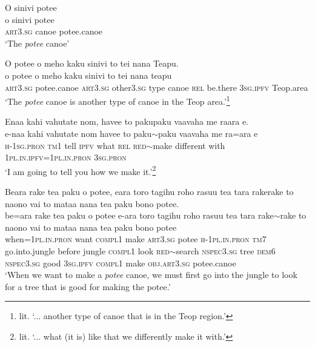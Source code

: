 \ea\label{ex:text18-1}
O sinivi potee\\
\gll o	sinivi	potee\\
     \textsc{art}3.\textsc{sg}	canoe	potee.canoe\\
\glt `The \textit{potee} canoe'
\z
\largerpage[2]

\ea\label{ex:text18-2}
O potee o meho kaku sinivi to tei nana Teapu.\\
\gll o	potee	o	meho	kaku	sinivi	to	tei	nana	teapu\\
     \textsc{art}3.\textsc{sg}	potee.canoe	\textsc{art}3.\textsc{sg}	other3.\textsc{sg}	type	canoe	\textsc{rel}	be.there	3\textsc{sg}.\textsc{ipfv}	Teop.area\\
\glt `The \textit{potee} canoe is another type of canoe in the Teop area.'\footnote{lit. `... another type of canoe that is in the Teop region.'}
\z

\ea\label{ex:text18-3}
Enaa kahi vahutate nom, havee to pakupaku vaavaha me raara e.\\
\gll e-naa	kahi	vahutate	nom	havee	to	paku{$\sim$}paku	vaavaha	me	ra=ara	e\\
     \textsc{h}-1\textsc{sg}.\textsc{pron}	\textsc{tm}1	tell	\textsc{ipfv}	what	\textsc{rel}	\textsc{red}{$\sim$}make	different	with	1\textsc{pl}.\textsc{in}.\textsc{ipfv}=1\textsc{pl}.\textsc{in}.\textsc{pron}	3\textsc{sg}.\textsc{pron}\\
\glt `I am going to tell you how we make it.'\footnote{lit. `... what (it is) like that we differently make it with.'}
\z

\ea\label{ex:text18-4}
Beara rake tea paku o potee, eara toro tagihu roho rasuu tea tara rakerake to naono vai to mataa nana tea paku bono potee.\\
\gll be=ara	rake	tea	paku	o	potee	e-ara	toro	tagihu	roho	rasuu	tea	tara	rake{$\sim$}rake	to	naono	vai	to	mataa	nana	tea	paku	bono	potee\\
     when=1\textsc{pl}.\textsc{in}.\textsc{pron}	want	\textsc{compl}1	make	\textsc{art}3.\textsc{sg}	potee	\textsc{h}-1\textsc{pl}.\textsc{in}.\textsc{pron}	\textsc{tm}7	go.into.jungle	before	jungle	\textsc{compl}1	look	\textsc{red}{$\sim$}search	\textsc{nspec}3.\textsc{sg}	tree	\textsc{dem}6	\textsc{nspec}3.\textsc{sg}	good	3\textsc{sg}.\textsc{ipfv}	\textsc{compl}1	make	\textsc{obj}.\textsc{art}3.\textsc{sg}	potee.canoe\\
\glt `When we want to make a \textit{potee} canoe, we must first go into the jungle to look for a tree that is good for making the potee.'
\z


